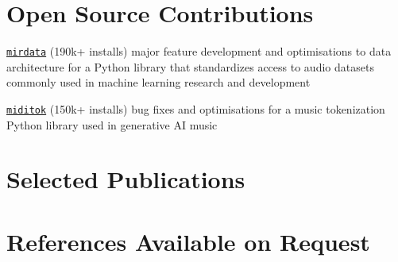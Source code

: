 \documentclass[letterpaper,11pt]{article}
\begin{document}
\section{Open Source Contributions}
 \begin{itemize}[leftmargin=0.15in, label={}]
    \small{
    \item{
    \href{https://github.com/mir-dataset-loaders/mirdata}{\texttt{mirdata}} (190k+ installs) major feature development and optimisations to data architecture for a Python library that standardizes access to audio datasets commonly used in machine learning research and development
    }
    \item{
    \href{https://github.com/Natooz/MidiTok}{\texttt{miditok}} (150k+ installs) bug fixes and optimisations for a music tokenization Python library used in generative AI music
    }}
\end{itemize}

\section{Selected Publications}
\nocite{*}
  \resumeSubHeadingListStart
    \printbibliography[heading=none, keyword=paper]
    \printbibliography[heading=none, keyword=preprint]
    \printbibliography[heading=none, keyword=proceedings]
\resumeSubHeadingListEnd

\section{References Available on Request}
\end{document}
